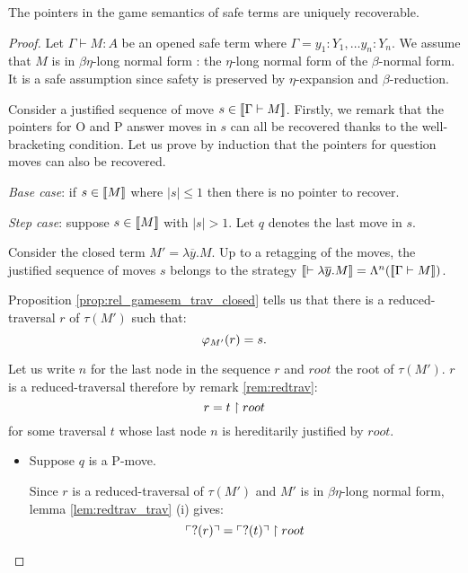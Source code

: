 \begin{prop}
The pointers in the game semantics of safe terms are
uniquely recoverable.
\end{prop}

\begin{proof}
Let $\Gamma \vdash M : A$ be an opened safe term where $\Gamma = y_1:Y_1, \ldots y_n:Y_n$.
We assume that $M$ is in $\beta \eta$-long normal form : the $\eta$-long normal form of the $\beta$-normal form.
It is a safe assumption since safety is preserved by $\eta$-expansion and $\beta$-reduction.

Consider a justified sequence of move $s \in {[\![\Gamma \vdash M ]\!]}$. Firstly,
we remark that the pointers for O and P answer moves in $s$ can all be
recovered thanks to the well-bracketing condition.
Let us prove by induction that the pointers for question moves can also be recovered.

\emph{Base case}: if $s \in {[\![M ]\!]}$ where $|s| \leq 1$ then there is no pointer to recover.

\emph{Step case}: suppose $s \in {[\![M ]\!]}$ with $|s| > 1$. Let $q$ denotes the last move in $s$.

Consider the closed term $M'  = \lambda \overline{y} . M$.
Up to a retagging of the moves, the justified sequence of moves $s$ belongs to the strategy
${[\![ \vdash \lambda \overline{y} . M ]\!]} = \Lambda^n({[\![ \Gamma \vdash M ]\!]})$.

Proposition \ref{prop:rel_gamesem_trav_closed} tells us that there
is a reduced-traversal $r$ of $\tau(M')$ such that:
$$\varphi_{M'}(r) = s.$$

Let us write $n$ for the last node in the sequence $r$
and $root$ the root of $\tau(M')$.
$r$ is a reduced-traversal therefore by remark \ref{rem:redtrav}:
$$ r = t \upharpoonright  root  $$
for some traversal $t$ whose last node $n$ is hereditarily justified by $root$.

\begin{itemize}
\item Suppose $q$ is a P-move.

Since $r$ is a reduced-traversal of $\tau(M')$ and $M'$ is in $\beta
\eta$-long normal form, lemma \ref{lem:redtrav_trav} (i) gives:
\begin{equation}
 \ulcorner ?(r) \urcorner = \ulcorner ?(t) \urcorner \upharpoonright  root  \label{eq:pre_pview_r}
\end{equation}



\end{itemize}
\end{proof}

